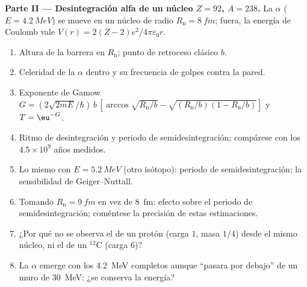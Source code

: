 \begin{problem}
\textbf{Parte II --- Desintegración alfa de un núcleo $Z = 92$, $A = 238$.}
La $\alpha$ ($E = \qty{4.2}{MeV}$) se mueve en un núcleo de radio
$R_{\text{n}} = \qty{8}{fm}$; fuera, la energía de Coulomb vale $V(r) =
2(Z - 2)e^2/4\pi\varepsilon_0r$.
\begin{enumerate}[resume]
  \item Altura de la barrera en $R_{\text{n}}$; punto de retroceso clásico
        $b$.
  \item Celeridad de la $\alpha$ dentro y su frecuencia de golpes contra la
        pared.
  \item Exponente de Gamow $G = (2\sqrt{2mE}/\hbar)\,b\,[\arccos\sqrt{R_{\text{n}}/b}
        - \sqrt{(R_{\text{n}}/b)(1 - R_{\text{n}}/b)}]$ y $T = \eu^{-G}$.
  \item Ritmo de desintegración y periodo de semidesintegración; compárese con los $4.5 \times
        10^9$ años medidos.
  \item Lo mismo con $E = \qty{5.2}{MeV}$ (otro isótopo): periodo de semidesintegración;
        la sensibilidad de Geiger--Nuttall.
  \item Tomando $R_{\text{n}} = \qty{9}{fm}$ en vez de \qty{8}{fm}: efecto sobre
        el periodo de semidesintegración; coméntese la precisión de estas estimaciones.
  \item ¿Por qué no se observa el  de un protón (carga $1$, masa $1/4$)
        desde el mismo núcleo, ni el de un $^{12}$C
        (carga $6$)?
  \item La $\alpha$ emerge con los \qty{4.2}{MeV} completos aunque
        ``pasara por debajo'' de un muro de \qty{30}{MeV}: ¿se conserva la energía?
\end{enumerate}


\end{problem}
